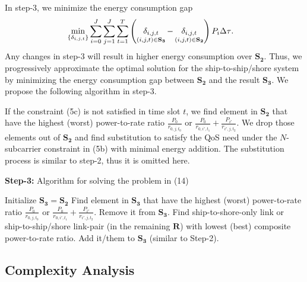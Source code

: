 \documentclass[journal]{IEEEtran}
\begin{document}
 In step-3, we minimize the energy consumption gap 
 \begin{align}
   &\mathop {\min }\limits_{\left\{ {{\delta _{i,j,t}}} \right\}}  {\sum\limits_{i = 0}^J {\sum\limits_{j = 1}^J {\sum\limits_{t = 1}^T {\left( {\mathop {{\delta _{i,j,t}}}\limits_{\left( {i,j,t} \right) \in {{\bf{S}}_{\bf{3}}}}  - \mathop {{\delta _{i,j,t}}}\limits_{\left( {i,j,t} \right) \in {{\bf{S}}_{\bf{2}}}} } \right){P_i}\Delta \tau } } } } .
 \end{align}
 Any changes in step-3 will result in higher energy consumption over ${{\mathbf{S}}_{\mathbf{2}}}$. Thus, we progressively approximate the optimal solution for the ship-to-ship/shore system by minimizing the energy consumption gap between ${{\mathbf{S}}_{\mathbf{2}}}$ and the result ${{\mathbf{S}}_{\mathbf{3}}}$. 
 We propose the following algorithm in step-3.
 
 If the constraint (5c) is not satisfied in time slot ${t}$, we find element in ${{\mathbf{S}}_{\mathbf{2}}}$ that have the highest (worst) power-to-rate ratio ${\frac{P_0}{r_{0,j,{t_0}}}}$ or  $ {\frac{{{P_0}}}{{{r_{0,i',{t_1}}}}} + \frac{{{P_{i'}}}}{{{r_{i',j,{t_2}}}}}} $. We drop those elements out of ${{\mathbf{S}}_{\mathbf{2}}}$ and find substitution to satisfy the QoS need under the $N$-subcarrier constraint in (5b) with minimal energy addition. The substitution process is similar to step-2, thus it is omitted here. 
 
 \begin{algorithm}[ht]
 \caption{\textbf{Step-3:} Algorithm for solving the problem in (14)}
 \begin{algorithmic}[1]
 \STATE Initialize ${{\mathbf{S}}_{\mathbf{3}}}={{\mathbf{S}}_{\mathbf{2}}}$
   \STATE Find element in ${{\mathbf{S}}_{\mathbf{3}}}$ that have the highest (worst) power-to-rate ratio ${\frac{P_0}{r_{0,j,{t_0}}}}$ or $ {\frac{{{P_0}}}{{{r_{0,i',{t_1}}}}} + \frac{{{P_{i'}}}}{{{r_{i',j,{t_2}}}}}} $. 
   \STATE Remove it from ${{\mathbf{S}}_{\mathbf{3}}}$.
    \STATE Find ship-to-shore-only link or ship-to-ship/shore link-pair (in the remaining ${\mathbf{R}}$) with lowest (best) composite power-to-rate ratio. 
    \STATE Add it/them to ${{\mathbf{S}}_{\mathbf{3}}}$ (similar to Step-2). 
   \ENDWHILE
  \ENDIF
 \ENDFOR
 \end{algorithmic}
 \end{algorithm}

 \subsection{Complexity Analysis}
\end{document}
